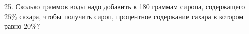 25. Сколько граммов воды надо добавить к 180 граммам сиропа, содержащего $25\%$ сахара, чтобы получить сироп, процентное содержание сахара в котором равно $20\%?$\\
